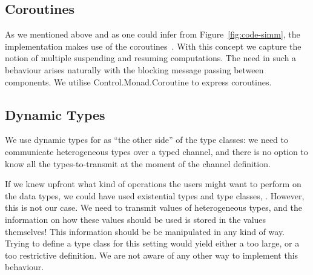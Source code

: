 \subsection{Coroutines}
\label{sec:impl-coroutines}
As we mentioned above and as one could infer from Figure~\ref{fig:code-simm}, the implementation makes use of the coroutines~\cite{coroutines}.
With this concept we capture the notion of multiple suspending and resuming computations.
The need in such a behaviour arises naturally with the blocking message passing between components.
We utilise \textsf{Control.Monad.Coroutine} \cite{cmt} to express coroutines.

\subsection{Dynamic Types}
We use dynamic types \cite{Abadi:1991:DTS:103135.103138} for as ``the other side'' of the type classes: we need to communicate heterogeneous types over a typed channel, and there is no option to know all the types-to-transmit at the moment of the channel definition.




If we knew upfront what kind of operations the users might want to perform on the data types, we could have used existential types and type classes, \viz \cite{Laufer:1994:PTI:186025.186031,Kiselyov:2004:STH:1017472.1017488}.
However, this is not our case.
We need to transmit values of heterogeneous types, and the information on how these values should be used is stored in the values themselves!
This information should be be manipulated in any kind of way.
Trying to define a type class for this setting would yield either a too large, or a too restrictive definition.
We are not aware of any other way to implement this behaviour.


